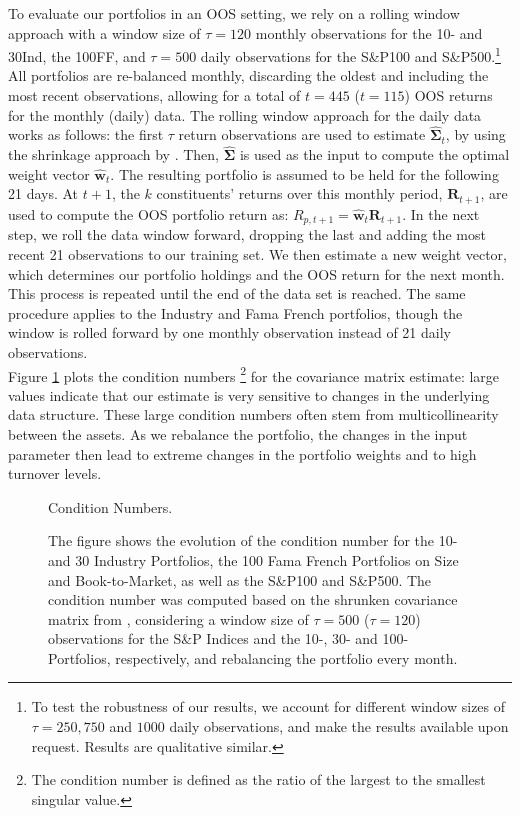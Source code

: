 \documentclass[12pt, a4paper]{article}
\newcommand{\bfw}{\boldsymbol{w} }
\newcommand{\bfSigma}{\boldsymbol{\Sigma} }
\begin{document}
To evaluate our portfolios in an OOS setting, we rely on a rolling window approach with a window size of $\tau=120$ monthly observations for the 10- and 30Ind, the 100FF, and $\tau=500$ daily observations for the S\&P100 and S\&P500.\footnote{To test the robustness of our results, we account for different window sizes of $\tau =250, 750$ and $1000$ daily observations, and make the results available upon request. Results are qualitative similar.} All portfolios are re-balanced monthly, discarding the oldest and including the most recent observations, allowing for a total of $t=445$ ($t=115$) OOS returns for the monthly (daily) data. The rolling window approach for the daily data works as follows: the first $\tau$ return observations are used to estimate $\hat{\bfSigma}_{t}$, by using the shrinkage approach by \cite{Ledoit2004}. Then, $\hat{\bfSigma}$ is used as the input to compute the optimal weight vector $\hat{\bfw}_{t}$. The resulting portfolio is assumed to be held for the following 21 days. At $t+1$, the $k$ constituents' returns over this monthly period, $\boldsymbol{R}_{t+1}$, are used to compute the OOS portfolio return as: $R_{p, t+1} = \hat{\bfw}_{t} \boldsymbol{R}_{t+1}$. In the next step, we roll the data window forward, dropping the last and adding the most recent 21 observations to our training set. We then estimate a new weight vector, which determines our portfolio holdings and the OOS return for the next month. This process is repeated until the end of the data set is reached. The same procedure applies to the Industry and Fama French portfolios, though the window is rolled forward by one monthly observation instead of 21 daily observations.\\
Figure \ref{Cond_Numbers} plots the condition numbers \footnote{The condition number is defined as the ratio of the largest to the smallest singular value.} for the covariance matrix estimate: large values indicate that our estimate is very sensitive to changes in the underlying data structure. These large condition numbers often stem from multicollinearity  between the assets. As we rebalance the portfolio, the changes in the input parameter then lead to extreme changes in the portfolio weights and to high turnover levels.

%
\begin{figure}[h!]
\centering
\caption{Condition Numbers.} \label{Cond_Numbers}
\captionsetup{font=scriptsize,labelfont=scriptsize, width=0.95\textwidth}
\caption*{The figure shows the evolution of the condition number for the 10- and 30 Industry Portfolios, the 100 Fama French Portfolios on Size and Book-to-Market, as well as the S\&P100 and S\&P500. The condition number was computed based on the shrunken covariance matrix from \cite{Ledoit2004}, considering a window size of $\tau=500$ ($\tau =120$) observations for the S\&P Indices and the 10-, 30- and 100- Portfolios, respectively, and rebalancing the portfolio every month.}
\end{figure}
%
\end{document}
